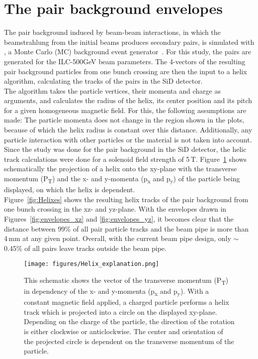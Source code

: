 \section{The pair background envelopes}
\label{Detector}
The pair background induced by beam-beam interactions, in which the beamstrahlung from the initial beams produces secondary \Pep \Pem pairs, is simulated with \guineapig, a Monte Carlo (MC) background event generator~\cite{Schulte:1997nga}.
For this study, the pairs are generated for the ILC-500GeV beam parameters.
The 4-vectors of the resulting pair background particles from one bunch crossing are then the input to a helix algorithm, calculating the tracks of the pairs in the SiD detector.\\
The algorithm takes the particle vertices, their momenta and charge as arguments, and calculates the radius of the helix, its center position and its pitch for a given homogeneous magnetic field.
For this, the following assumptions are made: 
The particle momenta does not change in the region shown in the plots, because of which the helix radius is constant over this distance.
Additionally, any particle interaction with other particles or the material is not taken into account.
Since the study was done for the pair background in the SiD detector, the helic track calculations were done for a solenoid field strength of \unit{5}\,{T}.
Figure~\ref{fig:helix_circle} shows schematically the projection of a helix onto the xy-plane with the transverse momentum (P\textsubscript{T}) and the x- and y-momenta (p\textsubscript{x} and p\textsubscript{y}) of the particle being displayed, on which the helix is dependent.\\
Figure~\ref{fig:Helixes} shows the resulting helix tracks of the pair background from one bunch crossing in the xz- and yz-plane.
With the envelopes drawn in Figures~\ref{fig:envelopes_xz} and \ref{fig:envelopes_yz}, it becomes clear that the distance between 99\% of all pair particle tracks and the beam pipe is more than \unit{4}\,{mm} at any given point.
Overall, with the current beam pipe design, only $\sim$ 0.45\% of all pairs leave tracks outside the beam pipe.\\
\begin{figure}
    \centering
    \texttt{[image: figures/Helix\_explanation.png]}
    \caption[Projection of the helix on the xy-plane]{
    This schematic shows the vector of the transverse momentum (P\textsubscript{T}) in dependency of the x- and y-momenta (p\textsubscript{x} and p\textsubscript{y}).
    With a constant magnetic field applied, a charged particle performs a helix track which is projected into a circle on the displayed xy-plane.
    Depending on the charge of the particle, the direction of the rotation is either clockwise or anticlockwise.
    The center and orientation of the projected circle is dependent on the transverse momentum of the particle.
    }
    \label{fig:helix_circle}
\end{figure}
